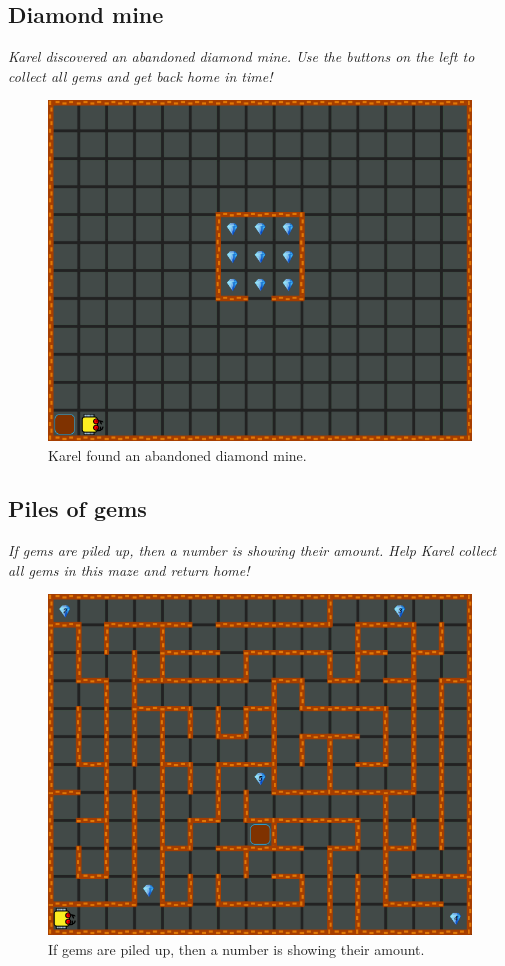 \subsection{Diamond mine}

{\em Karel discovered an abandoned diamond mine. Use the buttons
on the left to collect all gems and get back home in time!}

\begin{figure}[!ht]
\begin{center}
\includegraphics[height=0.4\textwidth]{img/a11.png}
\end{center}
\vspace{-4mm}
\caption{Karel found an abandoned diamond mine.}
\label{fig:a11}
\vspace{-10mm}
\end{figure}
\newpage
\noindent

\subsection{Piles of gems}

{\em If gems are piled up, then a number is showing their amount. 
Help Karel collect all gems in this maze and return home!}

\begin{figure}[!ht]
\begin{center}
\includegraphics[height=0.4\textwidth]{img/a12.png}
\end{center}
\vspace{-4mm}
\caption{If gems are piled up, then a number is showing their amount.}
\label{fig:a12}
\vspace{-10mm}
\end{figure}
\noindent

